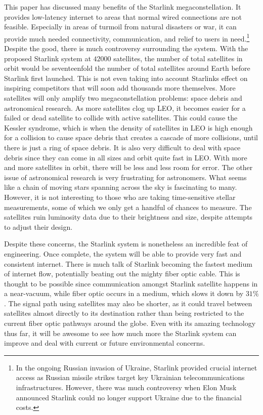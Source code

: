 \documentclass[10pt]{article}
\begin{document}
This paper has discussed many benefits of the Starlink megaconstellation. It provides low-latency internet to areas that normal wired connections are not feasible. Especially in areas of turmoil from natural disasters or war, it can provide much needed connectivity, communication, and relief to users in need.\footnote{In the ongoing Russian invasion of Ukraine, Starlink provided crucial internet access as Russian missile strikes target key Ukrainian telecommunications infrastructures. However, there was much controversy when Elon Musk announced Starlink could no longer support Ukraine due to the financial costs\cite{starlink_ukraine}.} 
Despite the good, there is much controversy surrounding the system. With the proposed Starlink system at $42000$ satellites, the number of total satellites in orbit would be seventeenfold the number of total satellites around Earth before Starlink first launched. This is not even taking into account Starlinks effect on inspiring competitors that will soon add thousands more themselves. More satellites will only amplify two megaconstellation problems: space debris and astronomical research. As more satellites clog up LEO, it becomes easier for a failed or dead satellite to collide with active satellites. This could cause the Kessler syndrome, which is when the density of satellites in LEO is high enough for a collision to cause space debris that creates a cascade of more collisions, until there is just a ring of space debris. It is also very difficult to deal with space debris since they can come in all sizes and orbit quite fast in LEO. With more and more satellites in orbit, there will be less and less room for error. The other issue of astronomical research is very frustrating for astronomers. What seems like a chain of moving stars spanning across the sky is fascinating to many. However, it is not interesting to those who are taking time-sensitive stellar measurements, some of which we only get a handful of chances to measure. The satellites ruin luminosity data due to their brightness and size, despite attempts to adjust their design.

Despite these concerns, the Starlink system is nonetheless an incredible feat of engineering. Once complete, the system will be able to provide very fast and consistent internet. There is much talk of Starlink becoming the fastest medium of internet flow, potentially beating out the mighty fiber optic cable. This is thought to be possible since communication amongst Starlink satellite happens in a near-vacuum, while fiber optic occurs in a medium, which slows it down by $31\%$. The signal path using satellites may also be shorter, as it could travel between satellites almost directly to its destination rather than being restricted to the current fiber optic pathways around the globe. Even with its amazing technology thus far, it will be awesome to see how much more the Starlink system can improve and deal with current or future environmental concerns.
\end{document}
